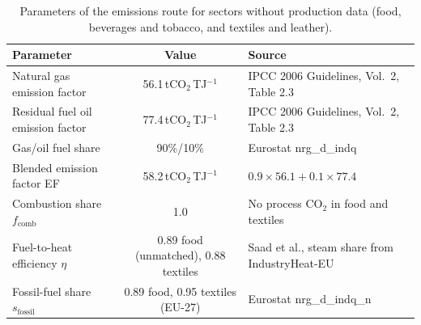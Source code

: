 \documentclass[11pt]{article}
\begin{document}
\begin{table}[h]
\centering
\small
\caption{Parameters of the emissions route for sectors without production data (food, beverages and tobacco, and textiles and leather).}
\label{tab:ef}
\begin{tabular}{p{4.6cm} c p{6.4cm}}
\toprule
Parameter & Value & Source \\
\midrule
Natural gas emission factor & 56.1\,tCO$_2$\,TJ$^{-1}$ & IPCC 2006 Guidelines, Vol.~2, Table 2.3\cite{ipcc2006stationary} \\
Residual fuel oil emission factor & 77.4\,tCO$_2$\,TJ$^{-1}$ & IPCC 2006 Guidelines, Vol.~2, Table 2.3\cite{ipcc2006stationary} \\
Gas/oil fuel share & 90\%/10\% & Eurostat nrg\_d\_indq\cite{eurostat_nrg_d_indq} \\
Blended emission factor EF & 58.2\,tCO$_2$\,TJ$^{-1}$ & $0.9\times56.1+0.1\times77.4$ \\
Combustion share $f_{\mathrm{comb}}$ & 1.0 & No process CO$_2$ in food and textiles \\
Fuel-to-heat efficiency $\eta$ & 0.89 food (unmatched), 0.88 textiles & Saad et al.\cite{saad2026}, steam share from IndustryHeat-EU\cite{industryheateu2025} \\
Fossil-fuel share $s_{\mathrm{fossil}}$ & 0.89 food, 0.95 textiles (EU-27) & Eurostat nrg\_d\_indq\_n\cite{eurostat_nrg_d_indq_n} \\
\bottomrule
\end{tabular}
\end{table}
\end{document}
